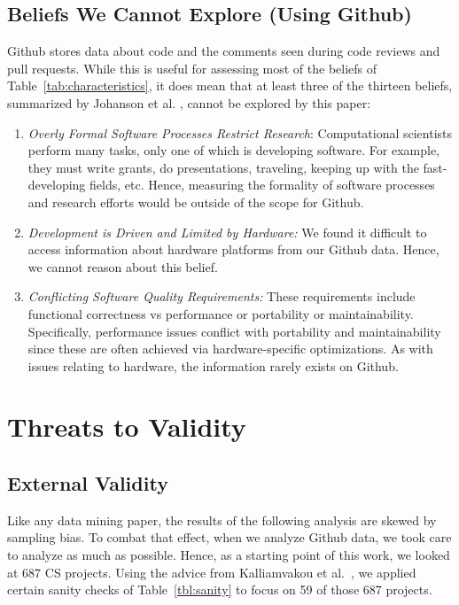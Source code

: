 \documentclass[sigconf]{acmart}
\newcommand{\be}{\begin{enumerate}}
\newcommand{\ee}{\end{enumerate}}
\begin{document}
\subsection{Beliefs We Cannot Explore (Using Github)}

Github stores data about code and the comments seen during code reviews and pull requests. While this is useful for assessing most of the beliefs of Table~\ref{tab:characteristics}, it does mean that at least three of the thirteen beliefs, summarized by Johanson et al. \cite{johan18_secs}, cannot be explored by this paper:

\be
\item {\em Overly Formal Software Processes Restrict Research}: Computational scientists perform many tasks,
only one of which is developing software. For example,
they must write grants, do presentations, traveling, keeping up with the fast-developing fields, etc. Hence, measuring the formality of software processes and research efforts would be outside of the scope for Github.
\item {\em Development is Driven and Limited by Hardware:}
We found it difficult to access information about hardware platforms from our Github data. Hence, we cannot reason about this belief.
\item {\em Conflicting Software Quality Requirements:} These requirements include functional correctness vs
performance or portability or maintainability. Specifically, performance issues conflict with portability and maintainability since these are often achieved via hardware-specific optimizations. As with issues
relating to hardware,
the information rarely exists on Github. 
\ee

\section{Threats to Validity}

\subsection{External Validity}
Like any data mining paper,
the results of the following analysis are skewed by sampling bias.
To combat that effect, when we analyze Github data, we took care to analyze as much as possible.
Hence,
as a starting point of this work, we looked at 687 CS projects. 
Using the advice from Kalliamvakou et al.~\cite{Kalliamvakou:2014}, we applied certain sanity checks of Table~\ref{tbl:sanity}  to focus on 59 of those 687 projects.
\end{document}
